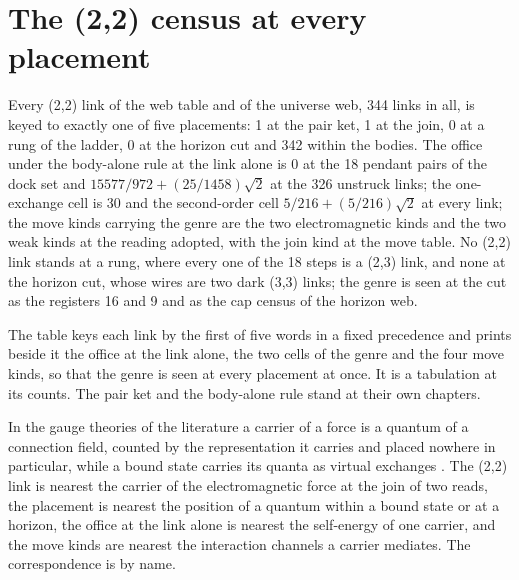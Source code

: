\section{The (2,2) census at every placement}\label{mod:X-0-D540399-the-two-two-census-at-every-placement}
\begin{chtable}
Every (2,2) link of the web table and of the universe web, 344 links in all, is keyed to exactly one of five placements: 1 at the pair ket, 1 at the join, 0 at a rung of the ladder, 0 at the horizon cut and 342 within the bodies. The office under the body-alone rule at the link alone is 0 at the 18 pendant pairs of the dock set and $15577/972 + (25/1458)\sqrt{2}$ at the 326 unstruck links; the one-exchange cell is 30 and the second-order cell $5/216 + (5/216)\sqrt{2}$ at every link; the move kinds carrying the genre are the two electromagnetic kinds and the two weak kinds at the reading adopted, with the join kind at the move table. No (2,2) link stands at a rung, where every one of the 18 steps is a (2,3) link, and none at the horizon cut, whose wires are two dark (3,3) links; the genre is seen at the cut as the registers 16 and 9 and as the cap census of the horizon web.
\end{chtable}
\chdeps{}{}
The table keys each link by the first of five words in a fixed precedence and prints beside it the office at the link alone, the two cells of the genre and the four move kinds, so that the genre is seen at every placement at once. It is a tabulation at its counts. The pair ket and the body-alone rule stand at their own chapters.
\begin{chbridge}
In the gauge theories of the literature a carrier of a force is a quantum of a connection field, counted by the representation it carries and placed nowhere in particular, while a bound state carries its quanta as virtual exchanges \cite{Weinberg1995,Peskin1995}. The (2,2) link is nearest the carrier of the electromagnetic force at the join of two reads, the placement is nearest the position of a quantum within a bound state or at a horizon, the office at the link alone is nearest the self-energy of one carrier, and the move kinds are nearest the interaction channels a carrier mediates. The correspondence is by name.
\end{chbridge}
